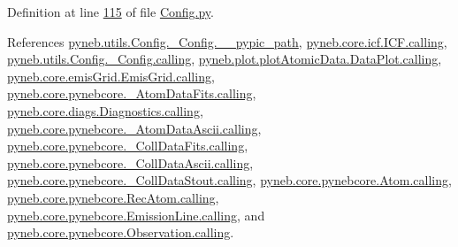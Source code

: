 Definition at line \hyperlink{_config_8py_source_l00115}{115} of file \hyperlink{_config_8py_source}{Config.\-py}.



References \hyperlink{_config_8py_source_l00107}{pyneb.\-utils.\-Config.\-\_\-\-Config.\-\_\-\-\_\-pypic\-\_\-path}, \hyperlink{icf_8py_source_l00016}{pyneb.\-core.\-icf.\-I\-C\-F.\-calling}, \hyperlink{_config_8py_source_l00032}{pyneb.\-utils.\-Config.\-\_\-\-Config.\-calling}, \hyperlink{plot_atomic_data_8py_source_l00042}{pyneb.\-plot.\-plot\-Atomic\-Data.\-Data\-Plot.\-calling}, \hyperlink{emis_grid_8py_source_l00044}{pyneb.\-core.\-emis\-Grid.\-Emis\-Grid.\-calling}, \hyperlink{pynebcore_8py_source_l00097}{pyneb.\-core.\-pynebcore.\-\_\-\-Atom\-Data\-Fits.\-calling}, \hyperlink{diags_8py_source_l00169}{pyneb.\-core.\-diags.\-Diagnostics.\-calling}, \hyperlink{pynebcore_8py_source_l00318}{pyneb.\-core.\-pynebcore.\-\_\-\-Atom\-Data\-Ascii.\-calling}, \hyperlink{pynebcore_8py_source_l00585}{pyneb.\-core.\-pynebcore.\-\_\-\-Coll\-Data\-Fits.\-calling}, \hyperlink{pynebcore_8py_source_l00936}{pyneb.\-core.\-pynebcore.\-\_\-\-Coll\-Data\-Ascii.\-calling}, \hyperlink{pynebcore_8py_source_l01156}{pyneb.\-core.\-pynebcore.\-\_\-\-Coll\-Data\-Stout.\-calling}, \hyperlink{pynebcore_8py_source_l01229}{pyneb.\-core.\-pynebcore.\-Atom.\-calling}, \hyperlink{pynebcore_8py_source_l02643}{pyneb.\-core.\-pynebcore.\-Rec\-Atom.\-calling}, \hyperlink{pynebcore_8py_source_l03385}{pyneb.\-core.\-pynebcore.\-Emission\-Line.\-calling}, and \hyperlink{pynebcore_8py_source_l03541}{pyneb.\-core.\-pynebcore.\-Observation.\-calling}.


